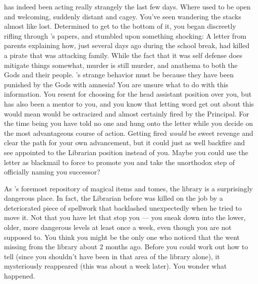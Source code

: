 \documentclass[char]{GL2020}
\begin{document}
\cLibrarian{} has indeed been acting really strangely the last few days. Where \cLibrarian{\they} used to be open and welcoming, \cLibrarian{\they} \cLibrarian{\are} suddenly distant and cagey. You've seen \cLibrarian{\them} wandering the stacks almost like \cLibrarian{\they} \cLibrarian{\were} lost. Determined to get to the bottom of it, you began discreetly rifling through \cLibrarian{}’s papers, and stumbled upon something shocking: A letter from \cLibrarian{\their} parents explaining how, just several days ago during the school break, \cLibrarian{\they} had killed a pirate that was attacking \cLibrarian{\their} family. While the fact that it was self defense does mitigate things somewhat, murder is still murder, and anathema to both the Gods and their people. \cLibrarian{}’s strange behavior must be because they have been punished by the Gods with amnesia! You are unsure what to do with this information. You resent \cLibrarian{} for choosing \cAmbition{} for the head assistant position over you, but \cLibrarian{\they} has also been a mentor to you, and you know that letting word get out about this would mean \cLibrarian{\they} would be ostracized and almost certainly fired by the Principal. For the time being you have told no one and hung onto the letter while you decide on the most advantageous course of action. Getting \cLibrarian{} fired \emph{would} be sweet revenge and clear the path for your own advancement, but it could just as well backfire and see \cAmbition{} appointed to the Librarian position instead of you. Maybe you could use the letter as blackmail to force \cLibrarian{} to promote you and take the unorthodox step of officially naming you \cLibrarian{\their} successor?

As \pEarth{}'s foremost repository of magical items and tomes, the library is a surprisingly dangerous place. In fact, the Librarian before \cLibrarian{} was killed on the job by a deteriorated piece of spellwork that backlashed unexpectedly when he tried to move it. Not that you have let that stop you — you sneak down into the lower, older, more dangerous levels at least once a week, even though you are not supposed to. You think you might be the only one who noticed that the \iScythe{} went missing from the library about 2 months ago. Before you could work out how to tell \cLibrarian{} (since you shouldn't have been in that area of the library alone), it mysteriously reappeared (this was about a week later). You wonder what happened.
\end{document}
